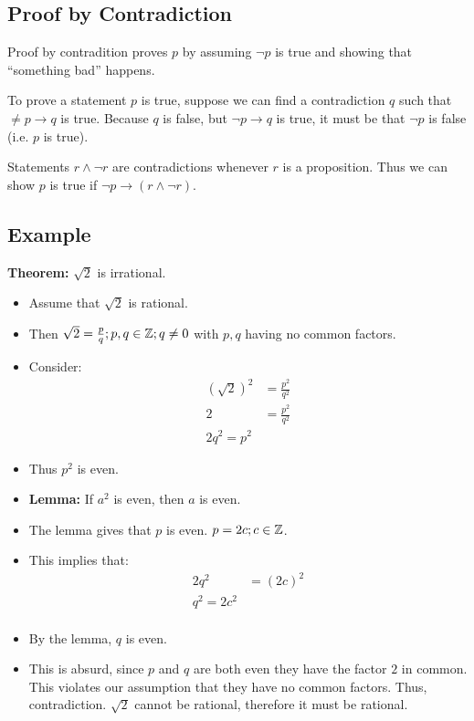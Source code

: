 \documentclass[letterpaper, 12pt]{math}
\begin{document}
\subsection*{Proof by Contradiction}
Proof by contradition proves \( p \) by assuming \( \neg{p} \) is true and
showing that ``something bad'' happens. \par
To prove a statement \( p \) is true, suppose we can find a contradiction
\( q \) such that \( \neq{p} \to q \) is true. Because \( q \) is false,
but \( \neg{p} \to q \) is true, it must be that \( \neg{p} \) is false
(i.e. \( p \) is true). \par
Statements \( r \wedge \neg{r} \) are contradictions whenever \( r \) is a
proposition. Thus we can show \( p \) is true if \( \neg{p} \to
(r \wedge \neg{r}) \).

\subsection*{Example}
\textbf{Theorem:} \( \sqrt{2} \) is irrational.
\begin{itemize}
  \item Assume that \( \sqrt{2} \) is rational.
  \item Then \( \sqrt{2} = \frac{p}{q}; p,q \in \mathbb{Z}; q \neq 0 \) with \( p,q \)
    having no common factors.
  \item Consider:
    \begin{align*}
      (\sqrt{2})^{2} &= \frac{p^{2}}{q^{2}} \\
      2 &= \frac{p^{2}}{q^{2}} \\
      2q^{2} = p^{2}
    \end{align*}
  \item Thus \( p^{2} \) is even.
  \item \textbf{Lemma:} If \( a^{2} \) is even, then \( a \) is even.
  \item The lemma gives that \( p \) is even. \( p = 2c; c \in \mathbb{Z} \).
  \item This implies that:
    \begin{align*}
      2q^{2} &= (2c)^{2} \\
      q^{2} = 2c^{2} \\
    \end{align*}
  \item By the lemma, \( q \) is even.
  \item This is absurd, since \( p \) and \( q \) are both even they have
    the factor \( 2 \) in common. This violates our assumption that they
    have no common factors. Thus, contradiction. \( \sqrt{2} \) cannot be
    rational, therefore it must be rational.
\end{itemize}
\end{document}
